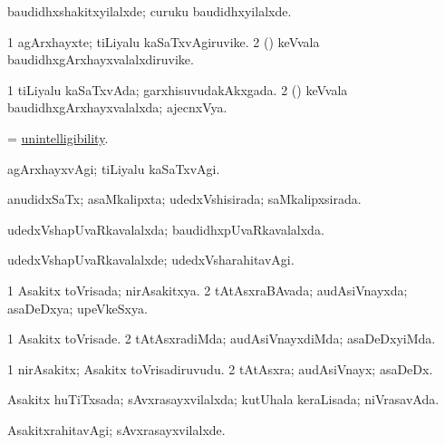 \bentry
{} 
\gl{\kirxvi}
\expl{}
\bmng
baudidhxshakitxyilalxde; curuku baudidhxyilalxde. 
\emng
\eentry

\bentry
{} 
\gl{\nA}
\expl{}
\bmng
\bnum
\num{1} agArxhayxte; tiLiyalu kaSaTxvAgiruvike. 
\num{2} (\tashA) keVvala baudidhxgArxhayxvalalxdiruvike. 
\enum
\emng
\eentry

\bentry
{} 
\gl{\gu}
\expl{}
\bmng
\bnum
\num{1} tiLiyalu kaSaTxvAda; garxhisuvudakAkxgada. 
\num{2} (\tashA) keVvala baudidhxgArxhayxvalalxda; ajecnxVya. 
\enum
\emng
\eentry

\bentry
{} 
\gl{\nA}
\expl{}
\bmng
= \hyperlink{unintelligibility}{unintelligibility}. 
\emng
\eentry

\bentry
{} 
\gl{\kirxvi}
\expl{}
\bmng
agArxhayxvAgi; tiLiyalu kaSaTxvAgi. 
\emng
\eentry

\bentry
{} 
\gl{\gu}
\expl{}
\bmng
anudidxSaTx; asaMkalipxta; udedxVshisirada; saMkalipxsirada. 
\emng
\eentry

\bentry
{} 
\gl{\gu}
\expl{}
\bmng
udedxVshapUvaRkavalalxda; baudidhxpUvaRkavalalxda. 
\emng
\eentry

\bentry
{} 
\gl{\kirxvi}
\expl{}
\bmng
udedxVshapUvaRkavalalxde; udedxVsharahitavAgi. 
\emng
\eentry

\bentry
{} 
\gl{\gu}
\expl{}
\bmng
\bnum
\num{1} Asakitx toVrisada; nirAsakitxya. 
\num{2} tAtAsxraBAvada; audAsiVnayxda; asaDeDxya; upeVkeSxya. 
\enum
\emng
\eentry

\bentry
{} 
\gl{\kirxvi}
\expl{}
\bmng
\bnum
\num{1} Asakitx toVrisade. 
\num{2} tAtAsxradiMda; audAsiVnayxdiMda; asaDeDxyiMda. 
\enum
\emng
\eentry

\bentry
{} 
\gl{\nA}
\expl{}
\bmng
\bnum
\num{1} nirAsakitx; Asakitx toVrisadiruvudu. 
\num{2} tAtAsxra; audAsiVnayx; asaDeDx. 
\enum
\emng
\eentry

\bentry
{} 
\gl{\gu}
\expl{}
\bmng
Asakitx huTiTxsada; sAvxrasayxvilalxda; kutUhala keraLisada; niVrasavAda. 
\emng
\eentry

\bentry
{} 
\gl{\kirxvi}
\expl{}
\bmng
AsakitxrahitavAgi; sAvxrasayxvilalxde. 
\emng
\eentry

